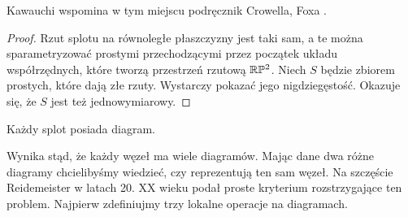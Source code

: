 Kawauchi \cite[s. 7]{kawauchi96} wspomina w tym miejscu podręcznik Crowella, Foxa \cite[s. 7]{crowell63}.

\begin{proof}
    Rzut splotu na równoległe płaszczyzny jest taki sam, a te można sparametryzować prostymi przechodzącymi przez początek układu współrzędnych, które tworzą przestrzeń rzutową $\mathbb R \mathbb P^2$.
    Niech $S$ będzie zbiorem prostych, które dają złe rzuty.
    Wystarczy pokazać jego nigdziegęstość.
    Okazuje się, że $S$ jest też jednowymiarowy.
\end{proof}

\begin{corollary}
    Każdy splot posiada diagram.
\end{corollary}

Wynika stąd, że każdy węzeł ma wiele diagramów.
Mając dane dwa różne diagramy chcielibyśmy wiedzieć, czy reprezentują ten sam węzeł.
Na szczęście Reidemeister w latach 20. XX wieku podał proste kryterium rozstrzygające ten problem.
Najpierw zdefiniujmy trzy lokalne operacje na diagramach.

